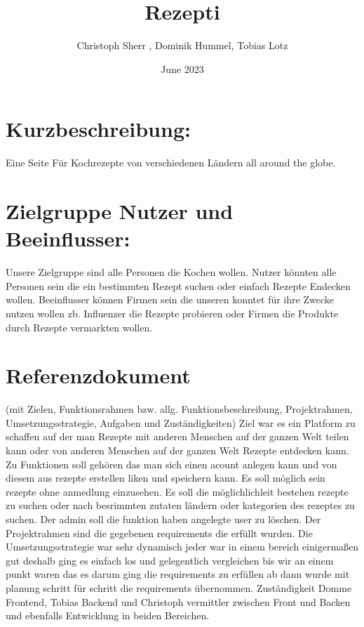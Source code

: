 \documentclass{report}
\title{Rezepti}
\author{ Christoph Sherr , Dominik Hummel, Tobias Lotz }
\date{June 2023}
\begin{document}
\maketitle

\section{Kurzbeschreibung:}
Eine Seite Für Kochrezepte von verschiedenen Ländern all around the globe.

\section{Zielgruppe Nutzer und Beeinflusser:}
Unsere Zielgruppe sind alle Personen die Kochen wollen. Nutzer könnten alle Personen sein die ein bestimmten Rezept suchen oder einfach Rezepte Endecken wollen. Beeinflusser können Firmen sein die unseren konntet für ihre Zwecke nutzen wollen zb. Influenzer die Rezepte probieren oder Firmen die Produkte durch Rezepte vermarkten wollen.

\section{Referenzdokument}
(mit Zielen, Funktionsrahmen bzw. allg. Funktionsbeschreibung, Projektrahmen, Umsetzungsstrategie, Aufgaben und Zuständigkeiten)
\newline\newline
Ziel war es ein Platform zu schaffen auf der man Rezepte mit anderen Menschen auf der ganzen Welt teilen kann oder von anderen Menschen auf der ganzen Welt Rezepte entdecken kann. 
\newline
Zu Funktionen soll gehören das man sich einen acount anlegen kann und von diesem aus rezepte erstellen liken und speichern kann. Es soll möglich sein rezepte ohne anmedlung einzusehen. Es soll die möglichlichleit bestehen rezepte zu suchen oder nach besrimmten zutaten ländern oder kategorien des rezeptes zu suchen. Der admin soll die funktion haben angelegte user zu löschen. 
\newline
Der Projektrahmen sind die gegebenen requirements die erfüllt wurden.
\newline
Die Umsetzungsstrategie war sehr dynamisch jeder war in einem bereich einigermaßen gut deshalb ging es einfach los und gelegentlich vergleichen bis wir an einem punkt waren das es darum ging die requirements zu erfüllen ab dann wurde mit planung schritt für schritt die requirements übernommen. 
\newline
Zuständigkeit Domme Frontend, Tobias Backend und Christoph vermittler zwischen Front und Backen und ebenfalls Entwicklung in beiden Bereichen.
\end{document}
